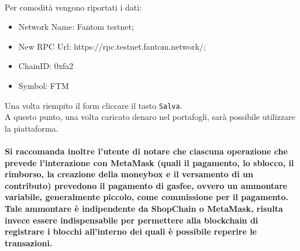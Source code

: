 \textbf{}\\
Per comodità vengono riportati i dati:
\begin{itemize}
    \item Network Name: Fantom testnet;
    \item New RPC Url: https://rpc.testnet.fantom.network/;
    \item ChainID: 0xfa2
    \item Symbol: FTM
\end{itemize}
Una volta riempito il form cliccare il tasto \texttt{Salva}.\\
A questo punto, una volta caricato denaro nel portafogli, sarà possibile utilizzare la piattaforma.\\\\
\textbf{Si raccomanda inoltre l'utente di notare che ciascuna operazione che prevede l'interazione con MetaMask (quali il pagamento, lo sblocco, il rimborso, la creazione della moneybox e il versamento di un contributo) prevedono il pagamento di gasfee, ovvero un ammontare variabile, generalmente piccolo, come commissione per il pagamento.\\
Tale ammontare è indipendente da ShopChain o MetaMask, risulta invece essere indispensabile per permettere alla blockchain\glo{} di registrare i blocchi all'interno dei quali è possibile reperire le transazioni.}